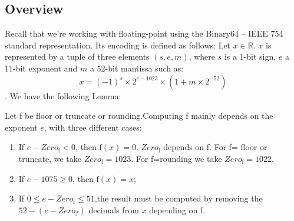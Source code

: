 \documentclass[runningheads]{llncs}
\begin{document}
\subsection{Overview}
  Recall that we're working with floating-point using the Binary64 -- IEEE 754 \cite{kahan1996ieee} standard representation. Its encoding is defined as follows:
    Let $x \in \mathbb{R}$. $x$ is represented by a tuple of three elements $(s,e,m)$, where $s$ is a 1-bit sign, $e$ a 11-bit exponent and $m$ a 52-bit mantissa such as:\begin{equation}\label{eq:ieee754}x= (-1)^s \times 2^{e-1023} \times (1+m\times 2^{-52})\end{equation}. We have the following Lemma:
    \begin{lemma}
      \label{lemma:function}
      Let f be floor or truncate or rounding.Computing f mainly depends on the exponent $e$, with three different cases:
    \begin{enumerate}
        \item If $e-Zero_\text{f}<0$, then $\text{f}(x)=0$. $Zero_\text{f}$ depends on f. For f= floor or truncate, we take $Zero_\text{f}=1023$. For f=rounding we take $Zero_\text{f}=1022$.
        \item If $e-1075\geq0$, then $\text{f}(x)=x$;
        \item If $0\leq e-Zero_\text{f} \leq 51$,the result must be computed by removing the $52-(e-Zero_{f})$ decimals from $x$ depending on f. 
    \end{enumerate}
    \end{lemma}
\end{document}
